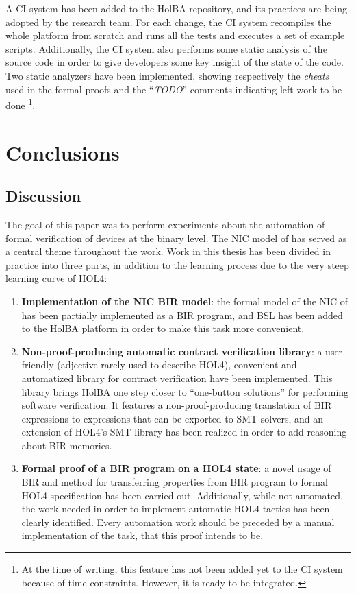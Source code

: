 \documentclass[10pt,a4paper]{article}
\begin{document}
\begin{multicols}{2}
A CI system has been added to the HolBA repository, and its practices are being adopted by the research team. For each change, the CI system recompiles the whole platform from scratch and runs all the tests and executes a set of example scripts. Additionally, the CI system also performs some static analysis of the source code in order to give developers some key insight of the state of the code. Two static analyzers have been implemented, showing respectively the \textit{cheats} used in the formal proofs and the ``\textit{TODO}'' comments indicating left work to be done \footnote{At the time of writing, this feature has not been added yet to the CI system because of time constraints. However, it is ready to be integrated.}.

\section{Conclusions}

\subsection{Discussion}

The goal of this paper was to perform experiments about the automation of formal verification of devices at the binary level. The NIC model of \cite{haglund_formal_2016} has served as a central theme throughout the work. Work in this thesis has been divided in practice into three parts, in addition to the learning process due to the very steep learning curve of HOL4:

\begin{enumerate}
    \item \textbf{Implementation of the NIC BIR model}: the formal model of the NIC of \cite{haglund_formal_2016} has been partially implemented as a BIR program, and BSL has been added to the HolBA platform in order to make this task more convenient.
    \item \textbf{Non-proof-producing automatic contract verification library}: a user-friendly (adjective rarely used to describe HOL4), convenient and automatized library for contract verification have been implemented. This library brings HolBA one step closer to ``one-button solutions'' for performing software verification. It features a non-proof-producing translation of BIR expressions to expressions that can be exported to SMT solvers, and an extension of HOL4's SMT library has been realized in order to add reasoning about BIR memories.
    \item \textbf{Formal proof of a BIR program on a HOL4 state}: a novel usage of BIR and method for transferring properties from BIR program to formal HOL4 specification has been carried out. Additionally, while not automated, the work needed in order to implement automatic HOL4 tactics has been clearly identified. Every automation work should be preceded by a manual implementation of the task, that this proof intends to be.
\end{enumerate}


\end{multicols}
\end{document}
